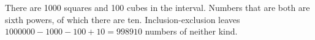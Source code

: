 There are 1000 squares and 100 cubes in the interval. Numbers that are both are sixth powers, of which there are ten. Inclusion-exclusion leaves $1000000-1000-100+10=\boxed{998910}$ numbers of neither kind.
